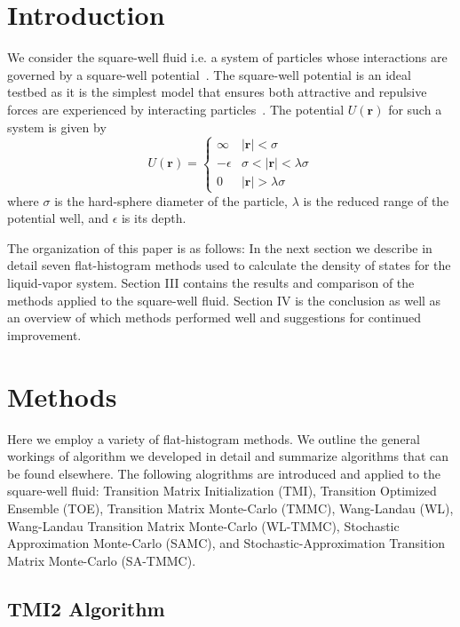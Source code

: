 \documentclass[letterpaper,twocolumn,amsmath,amssymb,pre,aps,10pt]{revtex4-1}
\begin{document}
\section{Introduction}

We consider the square-well fluid i.e. a system of particles whose interactions are governed by a square-well potential~\cite{singh2003surface, barker2004perturbationSW}.  The square-well potential is an ideal testbed as it is the simplest model that ensures both attractive and repulsive forces are experienced by interacting particles~\cite{barker1967-SW-perturbation, vega1992phase}.  The potential $U(\textbf{r})$ for such a system is given by
\begin{equation}
 U(\textbf{r})=\begin{cases} \infty & 
 \lvert\textbf{r}\rvert< \sigma\\-\epsilon & 
 \sigma<\lvert\textbf{r}\rvert<\lambda\sigma\\0 & 
 \lvert\textbf{r}\rvert > \lambda\sigma\end{cases}
\end{equation}
where $\sigma$ is the hard-sphere diameter of the particle, $\lambda$ is the
reduced range of the potential well, and $\epsilon$ is its depth.

The organization of this paper is as follows: In the next section we describe in detail seven flat-histogram methods used to calculate the density of states for the liquid-vapor system.  Section III contains the results and comparison of the methods applied to the square-well fluid.  Section IV is the conclusion as well as an overview of which methods performed well and suggestions for continued improvement. 


\section{Methods}

Here we employ a variety of flat-histogram methods.  We outline the general workings of algorithm we developed in detail and summarize algorithms that can be found elsewhere.  The following alogrithms are introduced and applied to the square-well fluid: Transition Matrix Initialization (TMI), Transition Optimized Ensemble (TOE), Transition Matrix Monte-Carlo (TMMC), Wang-Landau (WL), Wang-Landau Transition Matrix Monte-Carlo (WL-TMMC), Stochastic Approximation Monte-Carlo (SAMC), and Stochastic-Approximation Transition Matrix Monte-Carlo (SA-TMMC).

\subsection{TMI2 Algorithm}
\end{document}
